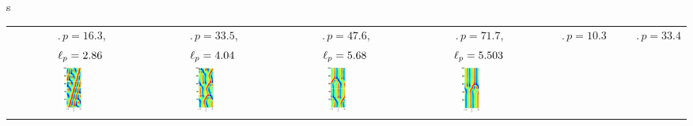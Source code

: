 \documentclass{beamer}
\begin{document}
\begin{frame}{\Rpo s}


\scriptsize
 \begin{tabular}{cccccc} 
~~~$\period{p} = 16.3$, & ~~~$\period{p} = 33.5$,  & ~~~$\period{p} = 47.6$,  &
                         ~~~$\period{p} = 71.7$,  & ~~~$\period{p} = 10.3$ & ~~~$\period{p} = 33.4$\\
~~~$\ell_p = 2.86$ & ~~~$\ell_p = 4.04$ & ~~~$\ell_p = 5.68$ & ~~~$\ell_p = 5.503$ & &\\
\includegraphics[width=0.15\textwidth]{../../figs/ks22rpo016.3-02.86.eps}\hspace{-3ex} &
\includegraphics[width=0.15\textwidth]{../../figs/ks22rpo033.5-04.04.eps}\hspace{-3ex} &
\includegraphics[width=0.15\textwidth]{../../figs/ks22rpo047.6-05.68.eps}\hspace{-3ex} &
\includegraphics[width=0.15\textwidth]{../../figs/ks22rpo071.7-05.50.eps}\hspace{-3ex} &

\end{tabular}
\end{frame}
\end{document}

